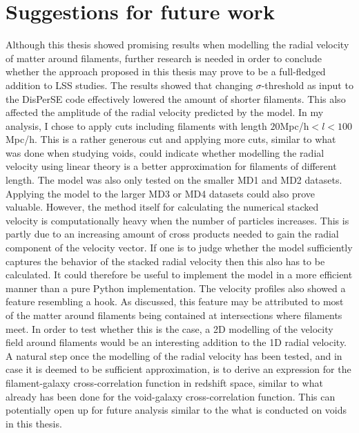 \section{Suggestions for future work}\label{sec:futurework}
Although this thesis showed promising results when modelling the radial velocity of matter around filaments, further research is needed in order to conclude whether the approach proposed in this thesis may prove to be a full-fledged addition to LSS studies. The results showed that changing $\sigma$-threshold as input to the DisPerSE code effectively lowered the amount of shorter filaments. This also affected the amplitude of the radial velocity predicted by the model. In my analysis, I chose to apply cuts including filaments with length $20$Mpc/h$<l<100$Mpc/h. This is a rather generous cut and applying more cuts, similar to what was done when studying voids, could indicate whether modelling the radial velocity using linear theory is a better approximation for filaments of different length. The model was also only tested on the smaller MD1 and MD2 datasets. Applying the model to the larger MD3 or MD4 datasets could also prove valuable. However, the method itself for calculating the numerical stacked velocity is computationally heavy when the number of particles increases. This is partly due to an increasing amount of cross products needed to gain the radial component of the velocity vector. If one is to judge whether the model sufficiently captures the behavior of the stacked radial velocity then this also has to be calculated. It could therefore be useful to implement the model in a more efficient manner than a pure Python implementation. The velocity profiles also showed a feature resembling a hook. As discussed, this feature may be attributed to most of the matter around filaments being contained at intersections where filaments meet. In order to test whether this is the case, a 2D modelling of the velocity field around filaments would be an interesting addition to the 1D radial velocity. A natural step once the modelling of the radial velocity has been tested, and in case it is deemed to be sufficient approximation, is to derive an expression for the filament-galaxy cross-correlation function in redshift space, similar to what already has been done for the void-galaxy cross-correlation function. This can potentially open up for future analysis similar to the what is conducted on voids in this thesis. \\\indent
